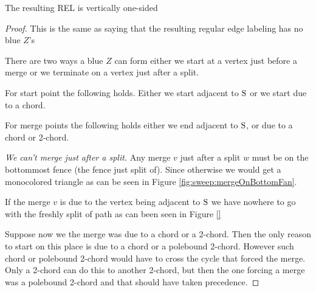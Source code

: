     \begin{lemma}
      \label{lm:sweep:vertOnsided}
      The resulting REL is vertically one-sided
    \end{lemma}
    \begin{proof}
      This is the same as saying that the resulting regular edge labeling has no blue $Z$'s

      There are two ways a blue $Z$ can form either we start at a vertex just before a merge or we terminate on a vertex just after a split.

      For start point the following holds. Either we start adjacent to $\mathrm{S}$ or we start due to a chord.

      For merge points the following holds either we end adjacent to $\mathrm{S}$, or due to a chord or 2-chord.

      \vspace{2ex}
      \emph{We can't merge just after a split.}
      Any merge $v$ just after a split $w$ must be on the bottommost fence (the fence just split of). Since otherwise we would get a monocolored triangle as can be seen in Figure \ref{fig:sweep:mergeOnBottomFan}.

      If the merge $v$ is due to the vertex being adjacent to $\mathrm{S}$ we have nowhere to go with the freshly split of path as can been seen in Figure \ref{}

      Suppose now we the merge was due to a chord or a 2-chord. Then the only reason to start on this place is due to a chord or a polebound 2-chord. However such chord or polebound 2-chord would have to cross the cycle that forced the merge. Only a 2-chord can do this to another 2-chord, but then the one forcing a merge was a polebound 2-chord and that should have taken precedence.


\end{proof}
